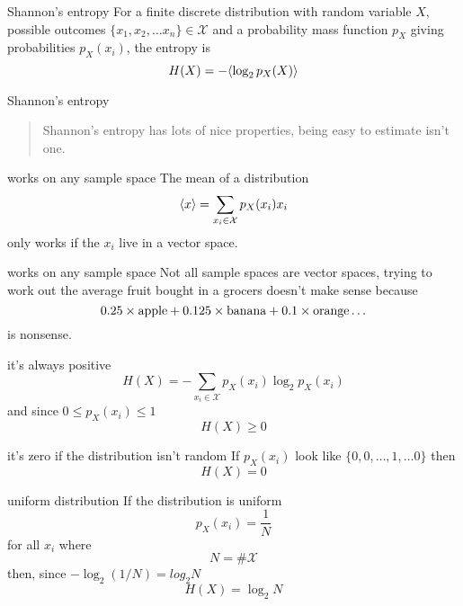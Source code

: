 \documentclass{beamer}
\newcommand{\crish}{\color{reddish}}
\newcommand{\cbla}{\color{black}}
\newcommand{\cblu}{\color{blue}}
\newcommand{\sm}{\color{reddish}$}
\newcommand{\fm}{$\color{black}{}}
\begin{document}
\begin{frame}{Shannon's entropy}
  For a finite discrete distribution with random variable \sm X\fm,
  possible outcomes \sm\{x_1,x_2,\ldots x_n\}\in\mathcal{X}\fm{} and a
  probability mass function \sm p_X\fm{} giving probabilities \sm p_X(x_i)\fm, the
  entropy is
\crish
  $$
H(X)=-\cblu\langle\crish \log_2{p_X(X)}\cblu\rangle\crish
  $$
\cbla
\end{frame}


\begin{frame}{Shannon's entropy}
  \begin{quote}
    Shannon's entropy has lots of nice properties, being easy to estimate isn't one.
  \end{quote}
\end{frame}

\begin{frame}{works on any sample space}
The mean of a distribution
\crish
$$
\langle x\rangle = \sum_{x_i\in \mathcal{X}}{p_X(x_i)\cblu{}x_i\crish{}}
$$
\cbla
only works if the \cblu $x_i$\cbla{} live in a vector space. 
  \end{frame}


\begin{frame}{works on any sample space}
Not all sample spaces are vector spaces, trying to work out the average fruit bought in a grocers doesn't make sense because
\crish
$$
0.25\times \mbox{\color{green}apple\crish}+0.125\times \mbox{\color{yellow}banana\crish}+0.1\times \mbox{\color{orange}orange\crish}\ldots
$$ \cbla is nonsense.
  \end{frame}


\begin{frame}{it's always positive}
\crish
  $$
H(X)=-\sum_{x_i\in \mathcal{X}}{p_X(x_i)\log_2p_X(x_i)}
$$
\cbla
 and since \sm 0\le p_X(x_i)\le 1 \fm 
 \crish
 $$
 H(X)\ge 0
 $$
 \cbla
\end{frame}

\begin{frame}{it's zero if the distribution isn't random}
  If \sm p_X(x_i)\fm{} look like \sm\{0,0,\dots,1,\ldots 0\}\fm{} then
\crish
 $$
 H(X)= 0
 $$
 \cbla
\end{frame}

\begin{frame}{uniform distribution}
  If the distribution is uniform
  \crish
  $$
  p_X(x_i)=\frac{1}{N}
$$
  \cbla
  for all \sm x_i\fm{} where
    \crish
  $$
  N=\#\mathcal{X}
$$
  \cbla
then, since \sm-\log_2(1/N)=log_2{N}\fm{}  
 \crish
 $$
 H(X)=\log_2{N}
 $$
 \cbla
\end{frame}
\end{document}
